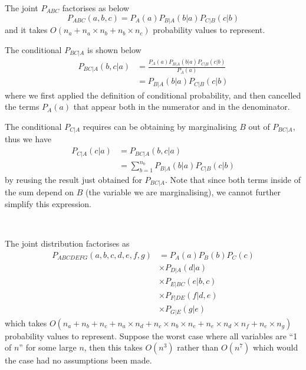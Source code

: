 \begin{Answer}[ref=ABC]
The joint $P_{ABC}$ factorises as below
\begin{equation}
P_{ABC}(a, b, c) = P_A(a)P_{B|A}(b|a)P_{C|B}(c|b)
\end{equation}
and it takes $O(n_a + n_a \times n_b + n_b \times n_c)$ probability values to represent.

The conditional $P_{BC|A}$ is shown below
\begin{subequations}
\begin{align}
P_{BC|A}(b, c|a) &= \frac{P_A(a)P_{B|A}(b|a)P_{C|B}(c|b)}{P_A(a)} \\
 &= P_{B|A}(b|a)P_{C|B}(c|b)
\end{align}
\end{subequations}
where we first applied the definition of conditional probability, and then cancelled the terms $P_A(a)$ that appear both in the numerator and in the denominator.

The conditional $P_{C|A}$ requires can be obtaining by marginalising $B$ out of $P_{BC|A}$, thus we have 
\begin{subequations}
\begin{align}
P_{C|A}(c|a) &= P_{BC|A}(b, c|a) \\
	&=\sum_{b=1}^{n_b} P_{B|A}(b|a)P_{C|B}(c|b)
\end{align}
\end{subequations}
by reusing the result just obtained for $P_{BC|A}$. 
Note that since both terms inside of the sum depend on $B$ (the variable we are marginalising), we cannot further simplify this expression.


\end{Answer}

~

\begin{Answer}[ref=A-G]
The joint distribution factorises as
\begin{equation}
\begin{aligned}
P_{ABCDEFG}(a,b,c,d,e,f,g) &= P_A(a) P_B(b) P_C(c) \\
	&\times P_{D|A}(d|a) \\
	&\times P_{E|BC}(e|b,c) \\
	&\times P_{F|DE}(f|d,e) \\
	&\times P_{G|E}(g|e) 
\end{aligned}
\end{equation}
which takes $O(n_a + n_b + n_c + n_a \times n_d + n_c \times n_b \times n_e + n_e \times n_d \times n_f + n_e \times n_g)$ probability values to represent.
Suppose the worst case where all variables are ``1 of $n$'' for some large $n$, then this takes $O(n^3)$ rather than $O(n^7)$ which would the case had no assumptions been made.
\end{Answer}

